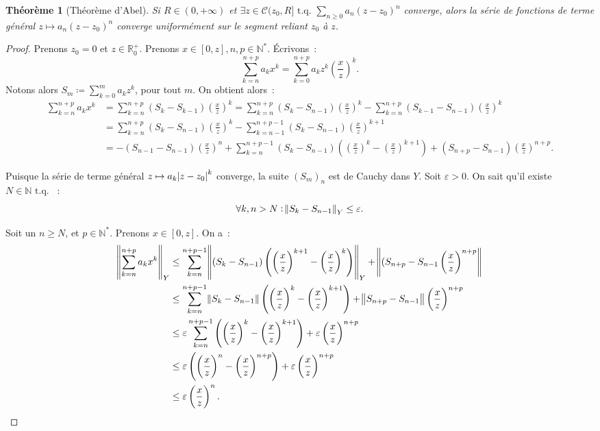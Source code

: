 \documentclass{report}
\newtheorem{thm}{Théorème}[chapter]
\theoremstyle{definition}
\theoremstyle{remark}
\numberwithin{equation}{section}
\newcommand{\R}{\mathbb R}
\newcommand{\Rp}{\R^{+}}
\newcommand{\N}{\mathbb N}
\newcommand{\Ns}{\N^{*}}
\newcommand{\tq}{\text{ t.q. }}
\newcommand{\pinfty}{{+\infty}}
\begin{document}
			\begin{thm}[Théorème d'Abel]\label{thm:cvgsurcercleimpliquecvusursegment} Si $R \in (0, \pinfty)$ et
			$\exists z \in \mathcal C(z_0, R] \tq \sum_{n \geq 0} a_n(z - z_0)^n$ converge, alors la série de fonctions de terme général
			$z \mapsto a_n(z - z_0)^n$ converge uniformément sur le segment reliant $z_0$ à $z$.
			\end{thm}

			\begin{proof} Prenons $z_0 = 0$ et $z \in \Rp_0$. Prenons $x \in [0, z], n, p \in \Ns$. Écrivons~:
			\begin{equation}
				\sum_{k=n}^{n+p}a_kx^k = \sum_{k=0}^{n+p}a_kz^k\left(\frac xz\right)^k.
			\end{equation}
			Notons alors $S_m \coloneqq \sum_{k=0}^ma_kz^k$, pour tout $m$. On obtient alors~:
			\begin{align}
				\sum_{k=n}^{n+p}a_kx^k &= \sum_{k=n}^{n+p}(S_k - S_{k-1})\left(\frac xz\right)^k
					= \sum_{k=n}^{n+p}(S_k - S_{n-1})\left(\frac xz\right)^k - \sum_{k=n}^{n+p}(S_{k-1} - S_{n-1})\left(\frac xz\right)^k \\
				&= \sum_{k=n}^{n+p}(S_k-S_{n-1})\left(\frac xz\right)^k - \sum_{k=n-1}^{n+p-1}(S_k-S_{n-1})\left(\frac xz\right)^{k+1} \\
				&= -(S_{n-1}-S_{n-1})\left(\frac xz\right)^n + \sum_{k=n}^{n+p-1}(S_k-S_{n-1})\left(\left(\frac xz\right)^k - \left(\frac xz\right)^{k+1}\right)
					+ (S_{n+p}-S_{n-1})\left(\frac xz\right)^{n+p}.
			\end{align}

			Puisque la série de terme général $z \mapsto a_k\abs {z-z_0}^k$ converge, la suite $(S_m)_n$ est de Cauchy dans $Y$. Soit $\varepsilon > 0$. On sait
			qu'il existe $N \in \N \tq$~:
			\begin{equation}
				\forall k, n > N : \norm {S_k - S_{n-1}}_Y \leq \varepsilon.
			\end{equation}

			Soit un $n \geq N$, et $p \in \Ns$. Prenons $x \in [0, z]$. On a~:
			\begin{align}
				\norm {\sum_{k=n}^{n+p}a_kx^k}_Y &\leq \sum_{k=n}^{n+p-1}\norm {(S_k-S_{n-1})\left(\left(\frac xz\right)^{k+1} - \left(\frac xz\right)^k\right)}_Y
					+ \norm {(S_{n+p}-S_{n-1}\left(\frac xz\right)^{n+p}} \\
				&\leq \sum_{k=n}^{n+p-1}\norm {S_k - S_{n-1}}\left(\left(\frac xz\right)^k - \left(\frac xz\right)^{k+1}\right)
					+ \norm {S_{n+p}-S_{n-1}}\left(\frac xz\right)^{n+p} \\
				&\leq \varepsilon\sum_{k=n}^{n+p-1}\left(\left(\frac xz\right)^k - \left(\frac xz\right)^{k+1}\right) + \varepsilon\left(\frac xz\right)^{n+p} \\
				&\leq \varepsilon\left(\left(\frac xz\right)^n - \left(\frac xz\right)^{n+p}\right) + \varepsilon\left(\frac xz\right)^{n+p} \\
				&\leq \varepsilon\left(\frac xz\right)^{n}.
			\end{align}


\end{proof}
\end{document}
